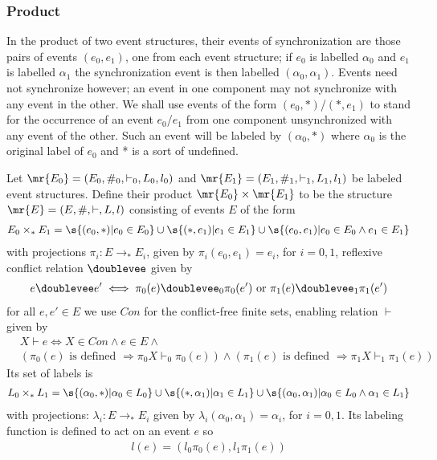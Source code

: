 \subsubsection{Product}
In the product of two event structures, their events of synchronization are those pairs of events $(e_0,e_1)$, one from each event structure;
if $e_0$ is labelled $\alpha_0$ and $e_1$ is labelled $\alpha_1$ the synchronization event is
then labelled $(\alpha_0,\alpha_1)$.
Events need not synchronize however; an event in one component may not synchronize with
any event in the other.
We shall use events of the form $(e_0,*)$/$(*,e_1)$ to stand for the occurrence of an event $e_0$/$e_1$
from one component unsynchronized with any event of the other.
Such an event will be labeled by $(\alpha_0,*)$ where $\alpha_0$ is the original label of $e_0$
and * is a sort of undefined.

\begin{definition}[Product]
    Let $\mr{E_0} = (E_0,\#_0,\vdash_0,L_0,l_0)$ and
    $\mr{E_1} = (E_1,\#_1,\vdash_1,L_1,l_1)$
    be labeled event structures.
    Define their product $\mr{E_0} \times \mr{E_1}$ to be the structure $\mr{E} = (E,\#,\vdash,L,l)$
    consisting of events $E$ of the form
    \begin{align*}
        E_0 \times_* E_1 =
        \s{(e_0,*)|e_0 \in E_0}
        \cup \s{(*,e_1)|e_1 \in E_1}
        \cup \s{(e_0,e_1)| e_0 \in E_0 \wedge e_1 \in E_1}
    \end{align*}
    with projections $\pi_i : E \rightarrow_* E_i$,
    given by $\pi_i(e_0,e_1) = e_i$, for $i=0,1$, reflexive conflict relation $\doublevee$ given by
    \begin{align*}
        e \doublevee e' \iff \pi_0(e) \doublevee_0 \pi_0(e') \text{ or }
        \pi_1(e) \doublevee_1 \pi_1(e')
    \end{align*}
    for all $e,e' \in E$ we use $Con$ for the conflict-free finite sets,
    enabling relation $\vdash$ given by
    \begin{align*}
         & X \vdash e \iff X \in Con \wedge e \in E \wedge                  \\
         & (\pi_0(e)\text{ is defined } \Rightarrow \pi_0X\vdash_0\pi_0(e))
        \wedge (\pi_1(e)\text{ is defined } \Rightarrow \pi_1X\vdash_1\pi_1(e))
    \end{align*}
    Its set of labels is
    \begin{align*}
        L_0 \times_* L_1 = \s{ (\alpha_0,*)|\alpha_0 \in L_0}
        \cup \s{(*,\alpha_1)|\alpha_1 \in L_1}
        \cup \s{(\alpha_0,\alpha_1)|\alpha_0 \in L_0 \wedge \alpha_1 \in L_1}
    \end{align*}
    with projections: $\lambda_i: E \rightarrow_* E_i$ given by
    $\lambda_i(\alpha_0,\alpha_1) = \alpha_i$, for $i=0,1$.
    Its labeling function is defined to act on an event $e$ so
    \begin{align*}
        l(e) = (l_0\pi_0(e),l_1\pi_1(e))
    \end{align*}
\end{definition}

